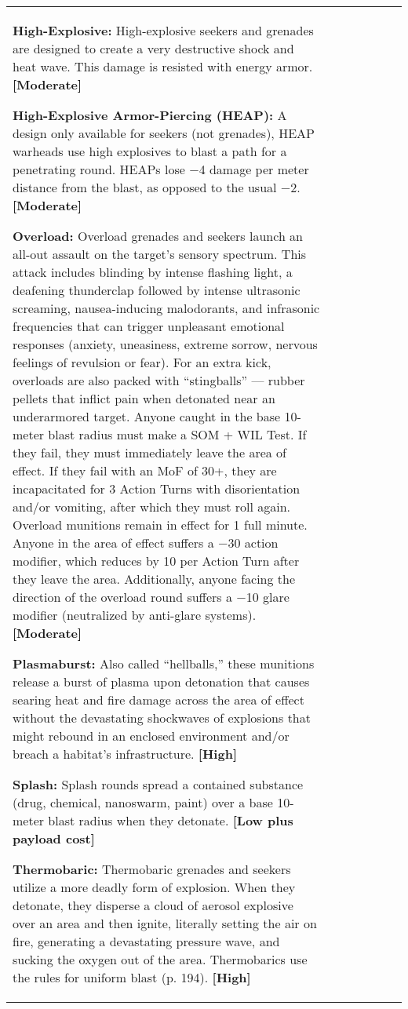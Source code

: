 \begin{tabular}{|l|l|l|l|l|l|l|}
\textbf{High-Explosive:} High-explosive seekers and grenades are designed to create a very destructive shock and heat wave. This damage is resisted with energy armor. \textbf{[Moderate]} 

\textbf{High-Explosive Armor-Piercing (HEAP):} A design only available for seekers (not grenades), HEAP warheads use high explosives to blast a path for a penetrating round. HEAPs lose $-$4 damage per meter distance from the blast, as opposed to the usual $-$2. \textbf{[Moderate]} 

\textbf{Overload:} Overload grenades and seekers launch an all-out assault on the target’s sensory spectrum. This attack includes blinding by intense flashing light, a deafening thunderclap followed by intense ultrasonic screaming, nausea-inducing malodorants, and infrasonic frequencies that can trigger unpleasant emotional responses (anxiety, uneasiness, extreme sorrow, nervous feelings of revulsion or fear). For an extra kick, overloads are also packed with ``stingballs'' --- rubber pellets that inflict pain when detonated near an underarmored target. Anyone caught in the base 10-meter blast radius must make a SOM + WIL Test. If they fail, they must immediately leave the area of effect. If they fail with an MoF of 30+, they are incapacitated for 3 Action Turns with disorientation and/or vomiting, after which they must roll again. Overload munitions remain in effect for 1 full minute. Anyone in the area of effect suffers a $-$30 action modifier, which reduces by 10 per Action Turn after they leave the area. Additionally, anyone facing the direction of the overload round suffers a $-$10 glare modifier (neutralized by anti-glare systems). \textbf{[Moderate]} 

\textbf{Plasmaburst:} Also called ``hellballs,'' these munitions release a burst of plasma upon detonation that causes searing heat and fire damage across the area of effect without the devastating shockwaves of explosions that might rebound in an enclosed environment and/or breach a habitat’s infrastructure. \textbf{[High]} 

\textbf{Splash:} Splash rounds spread a contained substance (drug, chemical, nanoswarm, paint) over a base 10- meter blast radius when they detonate. \textbf{[Low plus payload cost]} 

\textbf{Thermobaric:} Thermobaric grenades and seekers utilize a more deadly form of explosion. When they detonate, they disperse a cloud of aerosol explosive over an area and then ignite, literally setting the air on fire, generating a devastating pressure wave, and sucking the oxygen out of the area. Thermobarics use the rules for uniform blast (p. 194). \textbf{[High]} 


\end{tabular}
